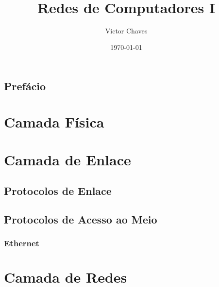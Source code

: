 \documentclass{imetex-notas}
\author{Victor Chaves}
\title{Redes de Computadores I}
\date{\today}
\begin{document}
 
\printFrontMatter

\chapter*{Prefácio}

\part{Camada Física}

\part{Camada de Enlace}
\chapter{Protocolos de Enlace}
\chapter{Protocolos de Acesso ao Meio}
\section{Ethernet}

\part{Camada de Redes}

\printBackMatter
\end{document}
